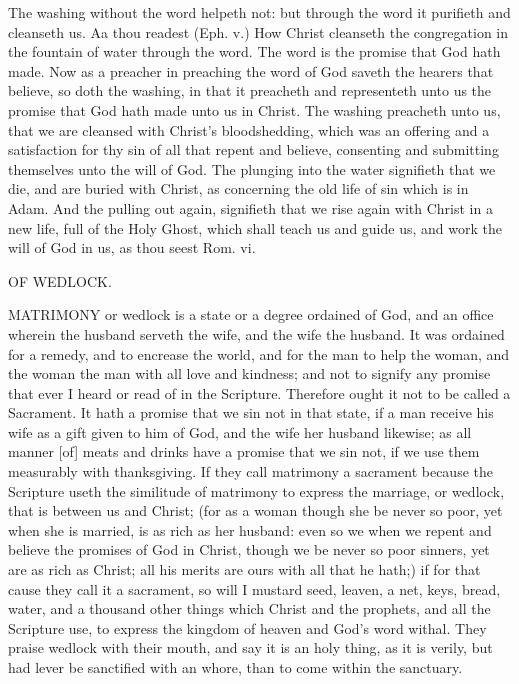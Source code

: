 The washing without the word helpeth not: but through 
the word it purifieth and cleanseth us. Aa thou readest 
(Eph. v.) How Christ cleanseth the congregation in the 
fountain of water through the word. The word is the 
promise that God hath made. Now as a preacher in 
preaching the word of God saveth the hearers that believe, 
so doth the washing, in that it preacheth and representeth 
unto us the promise that God hath made unto us in Christ. 
The washing preacheth unto us, that we are cleansed 
with Christ's bloodshedding, which was an offering and a 
satisfaction for thy sin of all that repent and believe, consenting
and submitting themselves unto the will of God. 
The plunging into the water signifieth that we die, and 
are buried with Christ, as concerning the old life of sin 
which is in Adam. And the pulling out again, signifieth 
that we rise again with Christ in a new life, full of the 
Holy Ghost, which shall teach us and guide us, and work 
the will of God in us, as thou seest Rom. vi. 


OF WEDLOCK. 

MATRIMONY or wedlock is a state or a degree ordained
of God, and an office wherein the husband 
serveth the wife, and the wife the husband. It was ordained
for a remedy, and to encrease the world, and for 
the man to help the woman, and the woman the man with 
all love and kindness; and not to signify any promise that 
ever I heard or read of in the Scripture. Therefore 
ought it not to be called a Sacrament. It hath a promise 
that we sin not in that state, if a man receive his wife as 
a gift given to him of God, and the wife her husband 
likewise; as all manner [of] meats and drinks have a promise
that we sin not, if we use them measurably with 
thanksgiving. If they call matrimony a sacrament because 
the Scripture useth the similitude of matrimony to express 
the marriage, or wedlock, that is between us and Christ; 
(for as a woman though she be never so poor, yet when 
she is married, is as rich as her husband: even so we when 
we repent and believe the promises of God in Christ, 
though we be never so poor sinners, yet are as rich as 
Christ; all his merits are ours with all that he hath;) if 
for that cause they call it a sacrament, so will I mustard 
seed, leaven, a net, keys, bread, water, and a thousand 
other things which Christ and the prophets, and all the 
Scripture use, to express the kingdom of heaven and God's 
word withal. They praise wedlock with their mouth, and 
say it is an holy thing, as it is verily, but had lever be sanctified
with an whore, than to come within the sanctuary. 


